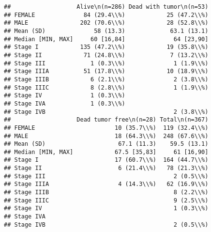 \documentclass[]{article}
\begin{document}
\begin{verbatim}
##                   Alive\n(n=286) Dead with tumor\n(n=53)
## FEMALE              84 (29.4\\%)            25 (47.2\\%)
## MALE               202 (70.6\\%)            28 (52.8\\%)
## Mean (SD)              58 (13.3)             63.1 (13.1)
## Median [MIN, MAX]     60 [16,84]              64 [23,90]
## Stage I            135 (47.2\\%)            19 (35.8\\%)
## Stage II            71 (24.8\\%)             7 (13.2\\%)
## Stage III             1 (0.3\\%)              1 (1.9\\%)
## Stage IIIA          51 (17.8\\%)            10 (18.9\\%)
## Stage IIIB            6 (2.1\\%)              2 (3.8\\%)
## Stage IIIC            8 (2.8\\%)              1 (1.9\\%)
## Stage IV              1 (0.3\\%)                        
## Stage IVA             1 (0.3\\%)                        
## Stage IVB                                     2 (3.8\\%)
##                   Dead tumor free\n(n=28) Total\n(n=367)
## FEMALE                       10 (35.7\\%)  119 (32.4\\%)
## MALE                         18 (64.3\\%)  248 (67.6\\%)
## Mean (SD)                     67.1 (11.3)    59.5 (13.1)
## Median [MIN, MAX]            67.5 [35,83]     61 [16,90]
## Stage I                      17 (60.7\\%)  164 (44.7\\%)
## Stage II                      6 (21.4\\%)   78 (21.3\\%)
## Stage III                                     2 (0.5\\%)
## Stage IIIA                    4 (14.3\\%)   62 (16.9\\%)
## Stage IIIB                                    8 (2.2\\%)
## Stage IIIC                                    9 (2.5\\%)
## Stage IV                                      1 (0.3\\%)
## Stage IVA                                               
## Stage IVB                                     2 (0.5\\%)
\end{verbatim}
\end{document}
